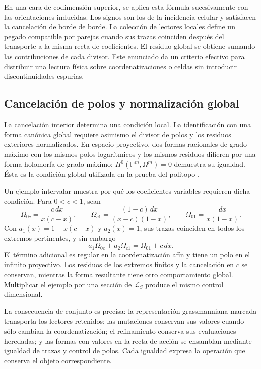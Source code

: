 En una cara de codimensión superior, se aplica esta fórmula sucesivamente
con las orientaciones inducidas. Los signos son los de la incidencia
celular y satisfacen la cancelación de borde de borde. La colección de
lectores locales define un pegado compatible por parejas cuando sus
trazas coinciden después del transporte a la misma recta de coeficientes.
El residuo global se obtiene sumando las contribuciones de cada divisor.
Este enunciado da un criterio efectivo para distribuir una lectura
física sobre coordenatizaciones o celdas sin introducir discontinuidades espurias.

\subsection{Cancelación de polos y normalización global}

La cancelación interior determina una condición local. La identificación
con una forma canónica global requiere asimismo el divisor de polos y
los residuos exteriores normalizados. En espacio proyectivo, dos
formas racionales de grado máximo con los mismos polos logarítmicos
y los mismos residuos difieren por una forma holomorfa de grado máximo;
\(H^0(\mathbb P^m,\Omega^m)=0\) demuestra su igualdad.
Ésta es la condición global utilizada en la prueba del politopo
\cite{positive}.

Un ejemplo intervalar muestra por qué los coeficientes variables
requieren dicha condición. Para \(0<c<1\), sean
\[
 \Omega_{0c}=\frac{c\,dx}{x(c-x)},\qquad
 \Omega_{c1}=\frac{(1-c)\,dx}{(x-c)(1-x)},\qquad
 \Omega_{01}=\frac{dx}{x(1-x)}.
\]
Con \(a_1(x)=1+x(c-x)\) y \(a_2(x)=1\), sus trazas coinciden
en todos los extremos pertinentes, y sin embargo
\[
 a_1\Omega_{0c}+a_2\Omega_{c1}=\Omega_{01}+c\,dx.
\]
El término adicional es regular en la coordenatización afín y tiene un polo en
el infinito proyectivo. Los residuos de los extremos finitos y la
cancelación en \(c\) se conservan, mientras la forma resultante
tiene otro comportamiento global. Multiplicar el ejemplo por una
sección de \(\mathcal L_S\) produce el mismo control dimensional.

La consecuencia de conjunto es precisa: la representación grassmanniana
marcada transporta los lectores retenidos; las mutaciones conservan sus
valores cuando sólo cambian la coordenatización; el refinamiento conserva sus
evaluaciones heredadas; y las formas con valores en la recta de acción
se ensamblan mediante igualdad de trazas y control de polos. Cada
igualdad expresa la operación que conserva el objeto correspondiente.
